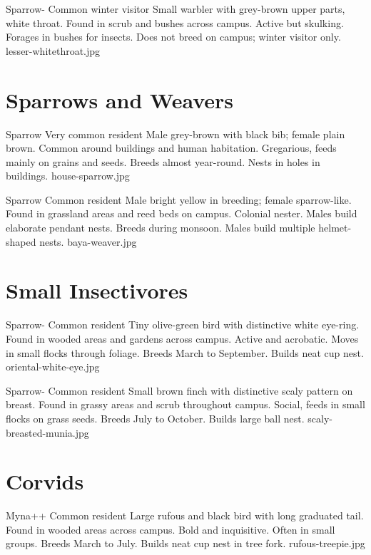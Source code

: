 \documentclass[aspectratio=169]{beamer}
\begin{document}
{Sparrow-}
{Common winter visitor}
{Small warbler with grey-brown upper parts, white throat.}
{Found in scrub and bushes across campus.}
{Active but skulking. Forages in bushes for insects.}
{Does not breed on campus; winter visitor only.}
{lesser-whitethroat.jpg}

\section{Sparrows and Weavers}
{Sparrow}
{Very common resident}
{Male grey-brown with black bib; female plain brown.}
{Common around buildings and human habitation.}
{Gregarious, feeds mainly on grains and seeds.}
{Breeds almost year-round. Nests in holes in buildings.}
{house-sparrow.jpg}

{Sparrow}
{Common resident}
{Male bright yellow in breeding; female sparrow-like.}
{Found in grassland areas and reed beds on campus.}
{Colonial nester. Males build elaborate pendant nests.}
{Breeds during monsoon. Males build multiple helmet-shaped nests.}
{baya-weaver.jpg}

\section{Small Insectivores}
{Sparrow-}
{Common resident}
{Tiny olive-green bird with distinctive white eye-ring.}
{Found in wooded areas and gardens across campus.}
{Active and acrobatic. Moves in small flocks through foliage.}
{Breeds March to September. Builds neat cup nest.}
{oriental-white-eye.jpg}

{Sparrow-}
{Common resident}
{Small brown finch with distinctive scaly pattern on breast.}
{Found in grassy areas and scrub throughout campus.}
{Social, feeds in small flocks on grass seeds.}
{Breeds July to October. Builds large ball nest.}
{scaly-breasted-munia.jpg}

\section{Corvids}
{Myna++}
{Common resident}
{Large rufous and black bird with long graduated tail.}
{Found in wooded areas across campus.}
{Bold and inquisitive. Often in small groups.}
{Breeds March to July. Builds neat cup nest in tree fork.}
{rufous-treepie.jpg}
\end{document}
